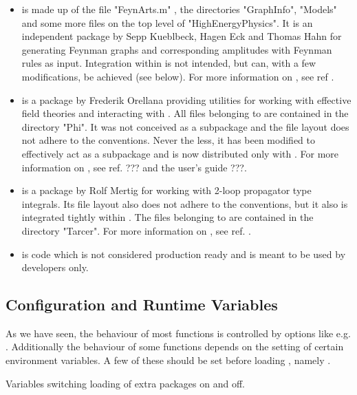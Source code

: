 \begin{itemize}

\item{{\bf \fa} is made up of the file "FeynArts.m" , the directories "GraphInfo", "Models" and some more files on the top level of "HighEnergyPhysics". It is an independent package by Sepp Kueblbeck, Hagen Eck and Thomas Hahn for generating Feynman graphs and corresponding amplitudes with Feynman rules as input. Integration within \fc is not intended, but can, with a few modifications, be achieved (see \fphi below).
For more information on \fa, see ref .}

\item{{\bf \fphi} is a package by Frederik Orellana providing utilities for working with effective field theories and interacting with \fa. All files belonging to \fphi are contained in the directory "Phi". It was not conceived as a \fc subpackage and the file layout does not adhere to the \fc conventions. Never the less, it has been modified to effectively act as a \fc subpackage and is now distributed only with \fc. For more information on \fphi, see ref. ??? and the \fphi user's guide ???.}

\item{{\bf \tarcer} is a package by Rolf Mertig for working with 2-loop propagator type integrals. Its file layout also does not adhere to the \fc conventions, but it also is integrated tightly within \fc. The files belonging to \tarcer are contained in the directory "Tarcer". For more information on \fa, see ref. .}

\item{{\bf \fcdevel} is code which is not considered production ready and is meant to be used by developers only.}

\end{itemize}

\subsection{Configuration and Runtime Variables}
\label{gamma5}

As we have seen, the behaviour of most functions is controlled by options like e.g. . Additionally the behaviour of some functions depends on the setting of certain environment variables. A few of these should be set before loading \fc, namely .

 {Variables switching loading of extra packages on and off.}


